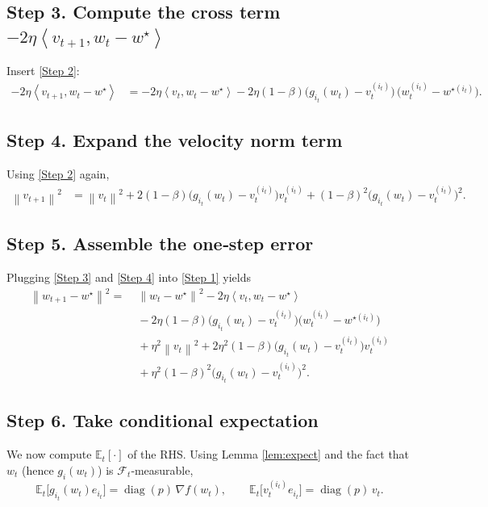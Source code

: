 \documentclass{article}
\newcommand{\E}{\mathbb{E}}
\newcommand{\norm}[1]{\left\|#1\right\|}
\newcommand{\ip}[2]{\left\langle #1,#2\right\rangle}
\newcommand{\diag}{\operatorname{diag}}
\begin{document}
\subsection*{Step 3.  Compute the cross term $-2\eta\ip{v_{t+1}}{w_t-w^{\star}}$}
Insert \eqref{Step 2}:
\begin{align}
-2\eta\ip{v_{t+1}}{w_t-w^{\star}}
&= -2\eta\ip{v_t}{w_t-w^{\star}}
-2\eta(1-\beta)\bigl(g_{i_t}(w_t)-v_t^{(i_t)}\bigr)\,
\bigl(w_t^{(i_t)}-w^{\star (i_t)}\bigr).
\tag{Step 3}
\end{align}

\subsection*{Step 4.  Expand the velocity norm term}
Using \eqref{Step 2} again,
\begin{align}
\norm{v_{t+1}}^{2}
&= \norm{v_t}^{2}
+2(1-\beta)\bigl(g_{i_t}(w_t)-v_t^{(i_t)}\bigr)v_t^{(i_t)}
+(1-\beta)^{2}\bigl(g_{i_t}(w_t)-v_t^{(i_t)}\bigr)^{2}.
\tag{Step 4}
\end{align}

\subsection*{Step 5.  Assemble the one‑step error}
Plugging \eqref{Step 3} and \eqref{Step 4} into \eqref{Step 1} yields
\begin{align}
\norm{w_{t+1}-w^{\star}}^{2}
=&\;\norm{w_t-w^{\star}}^{2}
-2\eta\ip{v_t}{w_t-w^{\star}} \nonumber\\
&\; -2\eta(1-\beta)\bigl(g_{i_t}(w_t)-v_t^{(i_t)}\bigr)
\bigl(w_t^{(i_t)}-w^{\star (i_t)}\bigr) \nonumber\\
&\; +\eta^{2}\norm{v_t}^{2}
+2\eta^{2}(1-\beta)\bigl(g_{i_t}(w_t)-v_t^{(i_t)}\bigr)v_t^{(i_t)} \nonumber\\
&\; +\eta^{2}(1-\beta)^{2}\bigl(g_{i_t}(w_t)-v_t^{(i_t)}\bigr)^{2}.
\tag{Step 5}
\end{align}

\subsection*{Step 6.  Take conditional expectation}
We now compute $\E_t[\cdot]$ of the RHS.  
Using Lemma \ref{lem:expect} and the fact that $w_t$ (hence $g_i(w_t)$) is $\mathcal{F}_t$‑measurable,
\[
\E_t\bigl[g_{i_t}(w_t)e_{i_t}\bigr]=\diag(p)\,\nabla f(w_t),
\qquad
\E_t\bigl[v_t^{(i_t)}e_{i_t}\bigr]=\diag(p)\,v_t.
\tag{Step 6a}
\]
\end{document}
